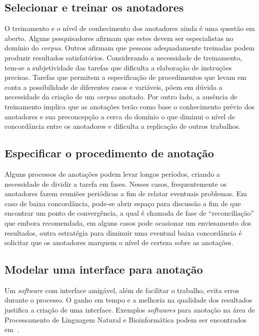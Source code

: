 

\subsection*{Selecionar e treinar os anotadores}

O treinamento e o nível de conhecimento dos anotadores ainda é uma questão em aberto. Alguns pesquisadores afirmam que estes devem ser especialistas no domínio do \textit{corpus}. Outros afirmam que pessoas adequadamente treinadas podem produzir resultados satisfatórios. 
Considerando a necessidade de treinamento, tem-se a subjetividade das tarefas que dificulta a elaboração de instruções precisas. Tarefas que permitem a especificação de procedimentos que levam em conta a possibilidade de diferentes casos e variáveis, põem em dúvida a necessidade da criação de um \textit{corpus} anotado.
Por outro lado, a ausência de treinamento implica que as anotações terão como base o conhecimento prévio dos anotadores e sua preconcepção a cerca do domínio o que diminui o nível de concordância entre os anotadores e dificulta a replicação de outros trabalhos.


\subsection*{Especificar o procedimento de anotação}
Alguns processos de anotações podem levar longos períodos, criando a necessidade de dividir a tarefa em fases. Nesses casos, frequentemente os anotadores fazem reuniões periódicas a fim de relatar eventuais problemas.  
Em caso de baixa concordância, pode-se abrir espaço para discussão a fim de que encontrar um ponto de convergência, a qual é chamada de fase de ``reconciliação'' que embora recomendada, em alguns casos pode ocasionar um enviesamento dos resultados, outra estratégia para diminuir uma eventual baixa concordância é solicitar que os anotadores marquem o nível de certeza sobre as anotações.

\subsection*{Modelar uma interface para anotação}
Um \textit{software} com interface amigável, além de facilitar o trabalho, evita erros durante o processo. 
O ganho em tempo e a melhoria na qualidade dos resultados justifica a criação de uma interface. 
Exemplos \textit{softwares} para anotação na área de Processamento de Linguagem Natural e Bioinformática podem ser encontrados em~\cite{Gruenstein2007}.




